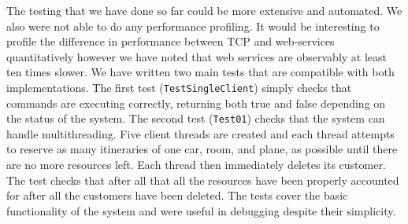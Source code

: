 \documentclass{article}
\begin{document}
The testing that we have done so far could be more extensive and automated. We also were not able to do any performance profiling. It would be interesting to profile the difference in performance between TCP and web-services quantitatively however we have noted that web services are observably at least ten times slower. We have written two main tests that are compatible with both implementations. The first test (\texttt{TestSingleClient}) simply checks that commands are executing correctly, returning both true and false depending on the status of the system. The second test (\texttt{Test01}) checks that the system can handle multithreading. Five client threads are created and each thread attempts to reserve as many itineraries of one car, room, and plane, as possible until there are no more resources left. Each thread then immediately deletes its customer. The test checks that after all that all the resources have been properly accounted for after all the customers have been deleted. The tests cover the basic functionality of the system and were useful in debugging despite their simplicity.
\end{document}
